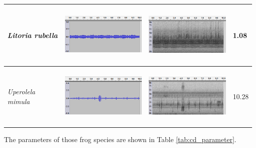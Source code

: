 \begin{table}[htb!]
{\begin{tabular}{llll}
\textit{Litoria rubella}            &    \begin{minipage}{.3\textwidth} \includegraphics[width=45mm, height=30mm]{image/Ch1/rubella_jcu_wav.png}  \end{minipage}      &   \begin{minipage}{.3\textwidth} \includegraphics[width=45mm, height=30mm]{image/Ch1/rubella_jcu_spec.png}  \end{minipage}          & 1.08     \\ \hline
\textit{Uperolela mimula}            &   \begin{minipage}{.3\textwidth} \includegraphics[width=45mm, height=30mm]{image/Ch1/mimula_jcu_wav.png}  \end{minipage}       &  \begin{minipage}{.3\textwidth} \includegraphics[width=45mm, height=30mm]{image/Ch1/mimula_jcu_spec.png}  \end{minipage}           & 10.28    \\ \hline\hline
\end{tabular}
}
\end{table}


\noindent The parameters of those frog species are shown in Table \ref{tab:cd_parameter}.


